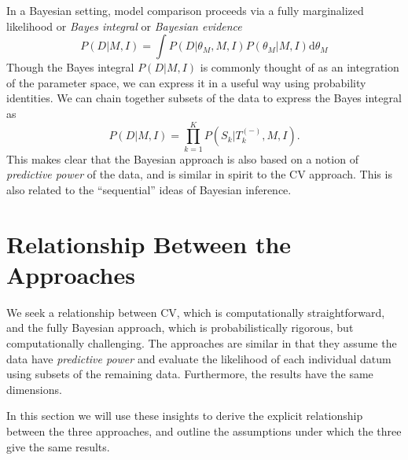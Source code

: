 \documentclass[12pt]{article}
\newcommand{\dd}{\mathrm{d}}
\newcommand{\Tkminus}{\ensuremath{T_k^{(-)}}}
\begin{document}
In a Bayesian setting, model comparison proceeds via a fully marginalized
likelihood or {\it Bayes integral} or {\it Bayesian evidence}
\begin{equation}
  P(D|M,I) = \int P(D|\theta_M,M,I) P(\theta_M|M,I)\dd\theta_M
\end{equation}
Though the Bayes integral $P(D|M,I)$ is commonly thought of as an
integration of the parameter space, we can express it in a useful way
using probability identities.  We can chain together subsets of the
data to express the Bayes integral as
\begin{equation}
  \label{eq:bayes_chain}
  P(D|M,I) = \prod_{k=1}^K P(S_k|\Tkminus,M,I).
\end{equation}
This makes clear that the Bayesian approach is also based on a notion of
{\it predictive power} of the data, and is similar in spirit to
the CV approach.  This is also related to the ``sequential'' ideas
of Bayesian inference.

\section{Relationship Between the Approaches}
We seek a relationship between CV, which is computationally straightforward,
and the fully Bayesian approach, which is probabilistically rigorous, but
computationally challenging.  The approaches are similar in that they assume
the data have {\it predictive power} and evaluate the likelihood of each
individual datum using subsets of the remaining data.  Furthermore, the
results have the same dimensions.

In this section we will use these insights to derive the explicit
relationship between the three approaches, and outline the assumptions
under which the three give the same results.
\end{document}
